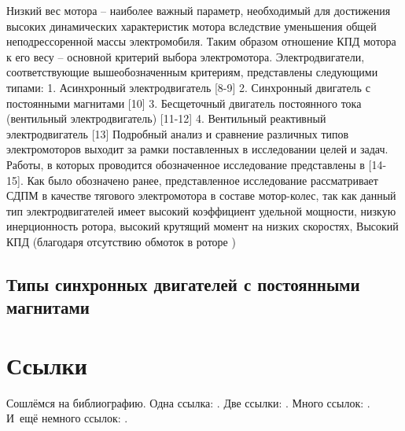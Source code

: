 Низкий вес мотора – наиболее важный параметр, необходимый для достижения высоких динамических характеристик мотора вследствие уменьшения общей неподрессоренной массы электромобиля. Таким образом отношение КПД мотора к его весу – основной критерий выбора электромотора. Электродвигатели, соответствующие вышеобозначенным критериям, представлены следующими типами:
1.	Асинхронный электродвигатель [8-9]
2.	Синхронный двигатель с постоянными магнитами [10]
3.	Бесщеточный двигатель постоянного тока (вентильный электродвигатель) [11-12]
4.	Вентильный реактивный электродвигатель [13]
Подробный анализ и сравнение различных типов электромоторов выходит за рамки поставленных в исследовании целей и задач. Работы, в которых проводится обозначенное исследование представлены в [14-15]. Как было обозначено ранее, представленное исследование рассматривает СДПМ в качестве тягового электромотора в составе мотор-колес, так как данный тип электродвигателей имеет высокий коэффициент удельной мощности, низкую инерционность ротора, высокий крутящий момент на низких скоростях, Высокий КПД (благодаря отсутствию обмоток в роторе )

\subsection{Типы синхронных двигателей с постоянными магнитами}


\section{Ссылки} \label{sec:ch1/sec2}
Сошлёмся на библиографию.
Одна ссылка: \cite[с.~54]{Sokolov}\cite[с.~36]{Gaidaenko}.
Две ссылки: \cite{Sokolov,Gaidaenko}.
Много ссылок: %
\cite{Lermontov, Management, Borozda, Marketing, Constitution, FamilyCode,
Gost.7.0.53, Razumovski, Lagkueva, Pokrovski, Methodology, Nasirova, Berestova,
Kriger}%
%
.
И~ещё немного ссылок:
\cite{Article,Book,Booklet,Conference,Inbook,Incollection,Manual,Mastersthesis,
Misc,Phdthesis,Proceedings,Techreport,Unpublished}
\cite{medvedev2006jelektronnye, CEAT:CEAT581, doi:10.1080/01932691.2010.513279,
Gosele1999161,Li2007StressAnalysis, Shoji199895, test:eisner-sample,
test:eisner-sample-shorted, AB_patent_Pomerantz_1968, iofis_patent1960}
%
.

